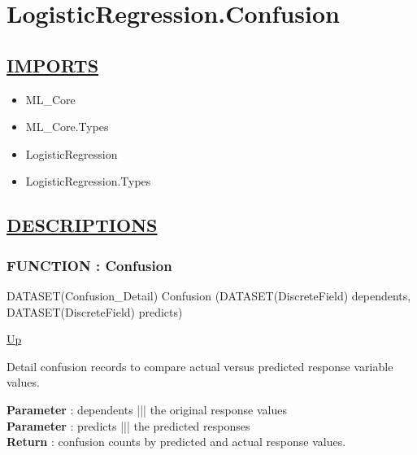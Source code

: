 \chapter*{LogisticRegression.Confusion}
\hypertarget{ecldoc:toc:LogisticRegression.Confusion}{}

\section*{\underline{IMPORTS}}
\begin{itemize}
\item ML\_Core
\item ML\_Core.Types
\item LogisticRegression
\item LogisticRegression.Types
\end{itemize}

\section*{\underline{DESCRIPTIONS}}
\subsection*{FUNCTION : Confusion}
\hypertarget{ecldoc:logisticregression.confusion}{}
\begin{minipage}[t]{\textwidth}
\begin{flushleft}
DATASET(Confusion\_Detail) Confusion (DATASET(DiscreteField) dependents, DATASET(DiscreteField) predicts)
\end{flushleft}
\end{minipage}
\hyperlink{ecldoc:toc:LogisticRegression}{Up}

\par
Detail confusion records to compare actual versus predicted response variable values.
\par
\textbf{Parameter} : dependents ||| the original response values \\
\textbf{Parameter} : predicts ||| the predicted responses \\
\textbf{Return} : confusion counts by predicted and actual response values. \\

